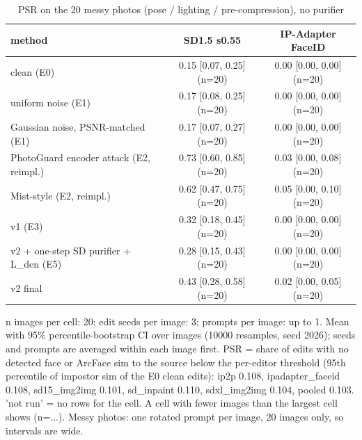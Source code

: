 \begin{table}[t]
\centering
\small
\begin{tabular}{lcc}
\toprule
method & SD1.5 s0.55 & IP-Adapter FaceID \\
\midrule
clean (E0) & 0.15 [0.07, 0.25] (n=20) & 0.00 [0.00, 0.00] (n=20) \\
uniform noise (E1) & 0.17 [0.08, 0.25] (n=20) & 0.00 [0.00, 0.00] (n=20) \\
Gaussian noise, PSNR-matched (E1) & 0.17 [0.07, 0.27] (n=20) & 0.00 [0.00, 0.00] (n=20) \\
PhotoGuard encoder attack (E2, reimpl.) & 0.73 [0.60, 0.85] (n=20) & 0.03 [0.00, 0.08] (n=20) \\
Mist-style (E2, reimpl.) & 0.62 [0.47, 0.75] (n=20) & 0.05 [0.00, 0.10] (n=20) \\
v1 (E3) & 0.32 [0.18, 0.45] (n=20) & 0.00 [0.00, 0.00] (n=20) \\
v2 + one-step SD purifier + L\_den (E5) & 0.28 [0.15, 0.43] (n=20) & 0.00 [0.00, 0.00] (n=20) \\
v2 final & 0.43 [0.28, 0.58] (n=20) & 0.02 [0.00, 0.05] (n=20) \\
\bottomrule
\end{tabular}
\caption{PSR on the 20 messy photos (pose / lighting / pre-compression), no purifier}
\label{tab:messy}
\par\footnotesize n images per cell: 20; edit seeds per image: 3; prompts per image: up to 1. Mean with 95\% percentile-bootstrap CI over images (10000 resamples, seed 2026); seeds and prompts are averaged within each image first. PSR = share of edits with no detected face or ArcFace sim to the source below the per-editor threshold (95th percentile of impostor sim of the E0 clean edits): ip2p 0.108, ipadapter\_faceid 0.108, sd15\_img2img 0.101, sd\_inpaint 0.110, sdxl\_img2img 0.104, pooled 0.103. 'not run' = no rows for the cell. A cell with fewer images than the largest cell shows (n=...). Messy photos: one rotated prompt per image, 20 images only, so intervals are wide.
\end{table}
